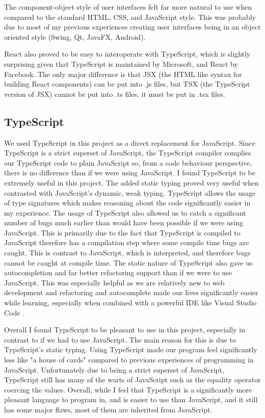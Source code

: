 \documentclass[10pt, journal]{IEEEtran}
\begin{document}
The component-object style of user interfaces felt far more natural to use when compared to the standard HTML, CSS, and JavaScript style. This was probably due to most of my previous experiences creating user interfaces being in an object oriented style (Swing, Qt, JavaFX, Android). 

React also proved to be easy to interoperate with TypeScript, which is slightly surprising given that TypeScript is maintained by Microsoft, and React by Facebook. The only major difference is that JSX (the HTML like syntax for building React components) can be put into .js files, but TSX (the TypeScript version of JSX) cannot be put into .ts files, it must be put in .tsx files.

\subsection{TypeScript}
We used TypeScript \cite{ts} in this project as a direct replacement for JavaScript. Since TypeScript is a strict superset of JavaScript, the TypeScript compiler complies our TypeScript code to plain JavaScript so, from a code behaviour perspective, there is no difference than if we were using JavaScript. I found TypeScript to be extremely useful in this project. The added static typing proved very useful when contrasted with JavaScript's dynamic, weak typing. TypeScript allows the usage of type signatures which makes reasoning about the code significantly easier in my experience. The usage of TypeScript also allowed us to catch a significant number of bugs much earlier than would have been possible if we were using JavaScript. This is primarily due to the fact that TypeScript is compiled to JavaScript therefore has a compilation step where some compile time bugs are caught. This is contrast to JavaScript, which is interpreted, and therefore bugs cannot be caught at compile time. The static nature of TypeScript also gave us autocompletion and far better refactoring support than if we were to use JavaScript. This was especially helpful as we are relatively new to web development and refactoring and autocomplete made our lives significantly easier while learning, especially when combined with a powerful IDE like Visual Studio Code \cite{vscode}.

Overall I found TypeScript to be pleasant to use in this project, especially in contrast to if we had to use JavaScript. The main reason for this is due to TypeScript's static typing. Using TypeScript made our program feel significantly less like "a house of cards" compared to previous experiences of programming in JavaScript. Unfortunately due to being a strict superset of JavaScript, TypeScript still has many of the warts of JavaScript such as the equality operator coercing the values. Overall, while I feel that TypeScript is a significantly more pleasant language to program in, and is easier to use than JavaScript, and it still has some major flaws, most of them are inherited from JavaScript.
\end{document}
